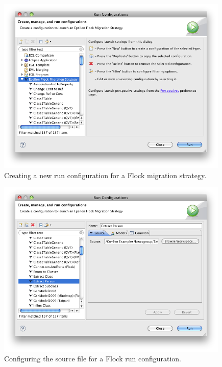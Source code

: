 \begin{figure}[tbp]
	\centering
		\includegraphics[height=8.5cm]{5.Implementation/images/flock_programmers_guide/new_launch_config.png}
	\caption{Creating a new run configuration for a Flock migration strategy.}
	\label{fig:flock_new_launch_config}
\end{figure}

\begin{figure}[tbp]
	\centering
		\includegraphics[height=8.5cm]{5.Implementation/images/flock_programmers_guide/new_launch_config_source.png}
	\caption{Configuring the source file for a Flock run configuration.}
	\label{fig:flock_new_launch_config_source}
\end{figure}

